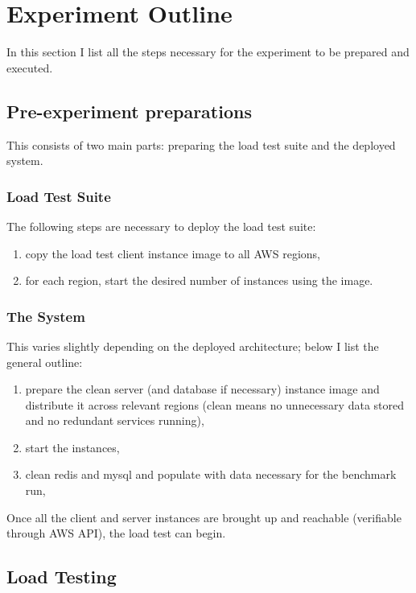 \documentclass{uvamscse}
\begin{document}
\section{Experiment Outline}

In this section I list all the steps necessary for the experiment to be prepared and executed.

\subsection{Pre-experiment preparations}

This consists of two main parts: preparing the load test suite and the deployed system.

\subsubsection{Load Test Suite}

The following steps are necessary to deploy the load test suite:
\begin{enumerate}
  \item copy the load test client instance image to all AWS regions,
  \item for each region, start the desired number of instances using the image.
\end{enumerate}

\subsubsection{The System}

This varies slightly depending on the deployed architecture; below I list the general outline:
\begin{enumerate}
  \item prepare the clean server (and database if necessary) instance image and distribute it across relevant regions (clean means no unnecessary data stored and no redundant services running),
  \item start the instances,
  \item clean redis and mysql and populate with data necessary for the benchmark run,
\end{enumerate}

Once all the client and server instances are brought up and reachable (verifiable through AWS API), the load test can begin.

\subsection{Load Testing}\label{Load Testing}
\end{document}
